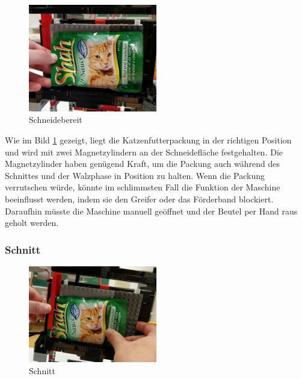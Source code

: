 \begin{figure}
\vspace{-30pt}
  \begin{center}
    \includegraphics[width=0.50\textwidth]{Bilder/Ablauf_1_png/Schneidebereit}
  \end{center}
  \caption{Schneidebereit}
  \label{Schneidebereit}
  \vspace{-10pt}
\end{figure}

Wie im Bild \ref{Schneidebereit} gezeigt, liegt die Katzenfutterpackung in der richtigen Position und wird mit zwei Magnetzylindern an der Schneidefläche festgehalten. Die Magnetzylinder haben genügend Kraft, um die Packung auch während des Schnittes und der Walzphase in Position zu halten. Wenn die Packung verrutschen würde, könnte im schlimmsten Fall die Funktion der Maschine beeinflusst werden, indem sie den Greifer oder das Förderband blockiert. Daraufhin müsste die Maschine manuell geöffnet und der Beutel per Hand raus geholt werden.
\subsubsection{Schnitt}

\begin{figure}
\vspace{-30pt}
  \begin{center}
    \includegraphics[width=0.50\textwidth]{Bilder/Ablauf_1_png/Schnitt}
  \end{center}
  \caption{Schnitt}
  \label{Schnitt}
  \vspace{-10pt}
\end{figure}

